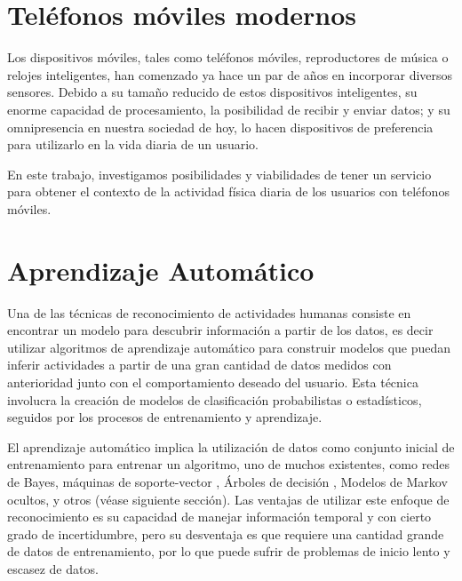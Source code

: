 \section{Teléfonos móviles modernos}

\label{sec24:dispositivos-moviles} Los dispositivos móviles, tales
como teléfonos móviles, reproductores de música o relojes inteligentes,
han comenzado ya hace un par de años en incorporar diversos sensores.
Debido a su tamaño reducido de estos dispositivos inteligentes, su
enorme capacidad de procesamiento, la posibilidad de recibir y enviar
datos; y su omnipresencia en nuestra sociedad de hoy, lo hacen dispositivos
de preferencia para utilizarlo en la vida diaria de un usuario.

En este trabajo, investigamos posibilidades y viabilidades de tener
un servicio para obtener el contexto de la actividad física diaria
de los usuarios con teléfonos móviles.


\section{Aprendizaje Automático}

\label{sec25:aprendizaje-automatico}Una de las técnicas de reconocimiento
de actividades humanas consiste en encontrar un modelo para descubrir
información a partir de los datos, es decir utilizar algoritmos de
aprendizaje automático para construir modelos que puedan inferir actividades
a partir de una gran cantidad de datos medidos con anterioridad junto
con el comportamiento deseado del usuario\cite{Chen2012}. Esta técnica
involucra la creación de modelos de clasificación probabilistas o
estadísticos, seguidos por los procesos de entrenamiento y aprendizaje.

El aprendizaje automático implica la utilización de datos como conjunto
inicial de entrenamiento para entrenar un algoritmo, uno de muchos
existentes, como redes de Bayes, máquinas de soporte-vector ,
Árboles de decisión , Modelos de Markov ocultos,
y otros \cite{Rajaraman2011} (véase siguiente sección). Las ventajas
de utilizar este enfoque de reconocimiento es su capacidad de manejar
información temporal y con cierto grado de incertidumbre, pero su
desventaja es que requiere una cantidad grande de datos de entrenamiento,
por lo que puede sufrir de problemas de inicio lento y escasez de
datos.

